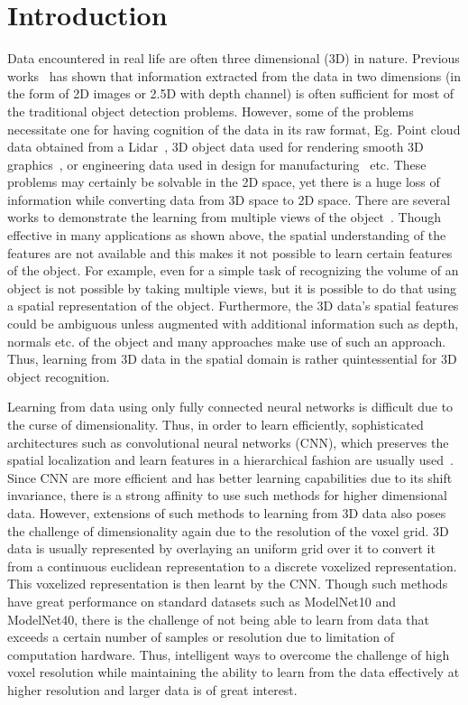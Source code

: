 \documentclass[10pt,letterpaper]{article}
\begin{document}
\section{Introduction}
\label{Sec:Introduction}
Data encountered in real life are often three dimensional (3D) in nature. Previous works~\citep{wu20153d,su15mvcnn} has shown that information extracted from the data in two dimensions (in the form of 2D images or 2.5D with depth channel) is often sufficient for most of the traditional object detection problems. However, some of the problems necessitate one for having cognition of the data in its raw format, Eg. Point cloud data obtained from a Lidar~\citep{qi2017pointnet++}, 3D object data used for rendering smooth 3D graphics~\citep{tatarchenko2017octree}, or engineering data used in design for manufacturing~\citep{GHADAI2018263} etc.  These problems may certainly be solvable in the 2D space, yet there is a huge loss of information while converting data from 3D space to 2D space. There are several works to demonstrate the learning from multiple views of the object~\citep{li2018sonet, kanezaki2016rotationnet, SFIKAS2018208, qi2016volumetric}. Though effective in many applications as shown above, the spatial understanding of the features are not available and this makes it not possible to learn certain features of the object. For example, even for a simple task of recognizing the volume of an object is not possible by taking multiple views, but it is possible to do that using a spatial representation of the object. Furthermore, the 3D data's spatial features could be ambiguous unless augmented with additional information such as depth, normals etc.  of the object and many approaches make use of such an approach. Thus, learning from 3D data in the spatial domain is rather quintessential for 3D object recognition.

Learning from data using only fully connected neural networks is difficult due to the curse of dimensionality. Thus, in order to learn efficiently, sophisticated architectures such as convolutional neural networks (CNN), which preserves the spatial localization and learn features in a hierarchical fashion are usually used~\citep{ioannidou2017deep,7353481}. Since CNN are more efficient and has better learning capabilities due to its shift invariance, there is a strong affinity to use such methods for higher dimensional data. However, extensions of such methods to learning from 3D data also poses the challenge of dimensionality again due to the resolution of the voxel grid. 3D data is usually represented by overlaying an uniform grid over it to convert it from a continuous euclidean representation to a discrete voxelized representation. This voxelized representation is then learnt by the CNN. Though such methods have great performance on standard datasets such as ModelNet10 and ModelNet40, there is the challenge of not being able to learn from data that exceeds a certain number of samples or resolution due to limitation of computation hardware. Thus, intelligent ways to overcome the challenge of high voxel resolution while maintaining the ability to learn from the data effectively at higher resolution and larger data is of great interest.\\
\end{document}
